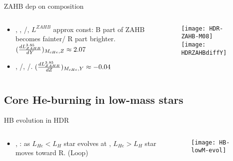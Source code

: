 \begin{frame}{ZAHB dep on composition}
\begin{columns}[T]
\begin{column}{0.55\textwidth}
\begin{itemize}
\item {}, , /, $L^{ZAHB}$ approx const: B part of ZAHB becomes fainter/ R part brighter. $(\TDy{Y}{L_{ZAHB}^{3.85}})_{M_{cHe},Z}\approx2.07$
\item {}, /, /. $(\TDy{Z}{L_{ZAHB}^{3.85}})_{M_{cHe},Y}\approx-0.04$
\end{itemize}
\end{column}
\begin{column}{0.45\textwidth}
\begin{figure}[!ht]
\texttt{[image: HDR-ZAHB-M08]}\label{fig:HDR-ZAHB-M08}
\texttt{[image: HDRZAHBdiffY]}\label{fig:HDRZAHBdiffY}
\end{figure}
\end{column}
\end{columns}
\end{frame}

\subsection{Core He-burning in low-mass stars}

\begin{frame}{HB evolution in HDR}
\begin{columns}[T]
\begin{column}{0.5\textwidth}
\begin{itemize}
\item {}, : as $L_{He}<L_H$ star evolves at , $L_{He}>L_H$ star moves toward R. (Loop)
\end{itemize}
\end{column}
\begin{column}{0.5\textwidth}
\begin{figure}[!ht]
\texttt{[image: HB-lowM-evol]}\label{fig:HB-lowM-evol}
\end{figure}
\end{column}
\end{columns}
\end{frame}

